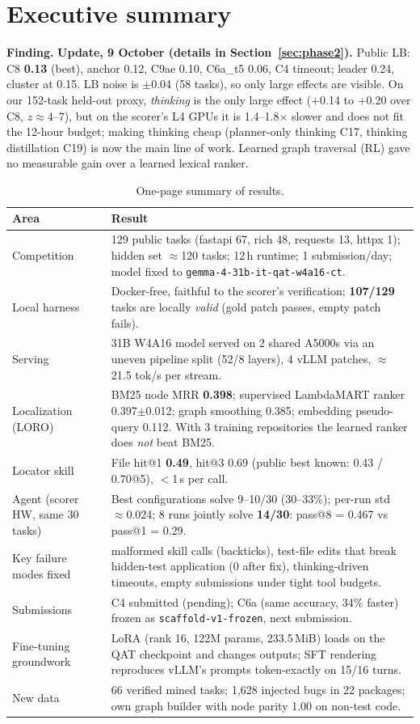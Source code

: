 \documentclass[10pt,a4paper]{article}
\newcommand{\code}[1]{\texttt{#1}}
\newcommand{\1}{\mathbb{1}}
\newcommand{\finding}[1]{\par\smallskip\noindent\colorbox{ForestGreen!8}{\parbox{\dimexpr\linewidth-2\fboxsep}{\small\textbf{Finding.} #1}}\par\smallskip}
\begin{document}
\section{Executive summary}
\finding{\textbf{Update, 9 October (details in Section~\ref{sec:phase2}).} Public LB: C8 \textbf{0.13} (best), anchor 0.12,
C9ae 0.10, C6a\_t5 0.06, C4 timeout; leader 0.24, cluster at 0.15. LB noise is $\pm$0.04 (58 tasks), so only large effects are visible.
On our 152-task held-out proxy, \emph{thinking} is the only large effect (+0.14 to +0.20 over C8, $z\approx 4$--7), but on the scorer's
L4 GPUs it is 1.4--1.8$\times$ slower and does not fit the 12-hour budget; making thinking cheap (planner-only thinking C17, thinking
distillation C19) is now the main line of work. Learned graph traversal (RL) gave no measurable gain over a learned lexical ranker.}
\begin{table}[H]\centering\small
\begin{tabularx}{\linewidth}{>{\raggedright\arraybackslash}p{4.2cm}X}
\toprule
\textbf{Area} & \textbf{Result} \\ \midrule
Competition & 129 public tasks (fastapi 67, rich 48, requests 13, httpx 1); hidden set $\approx$120 tasks; 12\,h runtime; 1 submission/day; model fixed to \code{gemma-4-31b-it-qat-w4a16-ct}. \\
Local harness & Docker-free, faithful to the scorer's verification; \textbf{107/129} tasks are locally \emph{valid} (gold patch passes, empty patch fails). \\
Serving & 31B W4A16 model served on 2 shared A5000s via an uneven pipeline split (52/8 layers), 4 vLLM patches, $\approx$21.5 tok/s per stream. \\
Localization (LORO) & BM25 node MRR \textbf{0.398}; supervised LambdaMART ranker 0.397$\pm$0.012; graph smoothing 0.385; embedding pseudo-query 0.112. With 3 training repositories the learned ranker does \emph{not} beat BM25. \\
Locator skill & File hit@1 \textbf{0.49}, hit@3 0.69 (public best known: 0.43 / 0.70@5), $<$1\,s per call. \\
Agent (scorer HW, same 30 tasks) & Best configurations solve 9--10/30 (30--33\%); per-run std $\approx$0.024; 8 runs jointly solve \textbf{14/30}: pass@8 = 0.467 vs pass@1 = 0.29. \\
Key failure modes fixed & malformed skill calls (backticks), test-file edits that break hidden-test application (0 after fix), thinking-driven timeouts, empty submissions under tight tool budgets. \\
Submissions & C4 submitted (pending); C6a (same accuracy, 34\% faster) frozen as \code{scaffold-v1-frozen}, next submission. \\
Fine-tuning groundwork & LoRA (rank 16, 122M params, 233.5\,MiB) loads on the QAT checkpoint and changes outputs; SFT rendering reproduces vLLM's prompts token-exactly on 15/16 turns. \\
New data & 66 verified mined tasks; 1{,}628 injected bugs in 22 packages; own graph builder with node parity 1.00 on non-test code. \\
\bottomrule
\end{tabularx}
\caption{One-page summary of results.}
\end{table}
\end{document}
